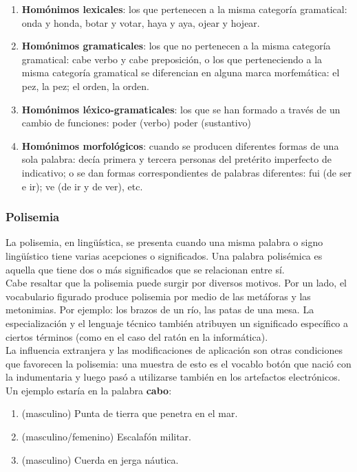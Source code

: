 \documentclass[../all.tex]{subfiles}
\begin{document}
	\begin{enumerate}[resume]
		\setcounter{enumi}{0}
		\item \textbf{Homónimos lexicales}: los que pertenecen a la misma categoría gramatical: onda y honda, botar y votar, haya y aya, ojear y hojear.
		\item \textbf{Homónimos gramaticales}: los que no pertenecen a la misma categoría gramatical: cabe verbo y cabe preposición, o los que perteneciendo a la misma categoría gramatical se diferencian en alguna marca morfemática: el pez, la pez; el orden, la orden.
		\item \textbf{Homónimos léxico-gramaticales}: los que se han formado a través de un cambio de funciones: poder (verbo) poder (sustantivo)
		\item \textbf{Homónimos morfológicos}: cuando se producen diferentes formas de una sola palabra: decía primera y tercera personas del pretérito imperfecto de indicativo; o se dan formas correspondientes de palabras diferentes: fui (de ser e ir); ve (de ir y de ver), etc.
	\end{enumerate}

\subsubsection{Polisemia}
	La polisemia, en lingüística, se presenta cuando una misma palabra o signo lingüístico tiene varias acepciones o significados. Una palabra polisémica es aquella que tiene dos o más significados que se relacionan entre sí.\\
	
	Cabe resaltar que la polisemia puede surgir por diversos motivos. Por un lado, el vocabulario figurado produce polisemia por medio de las metáforas y las metonimias. Por ejemplo: los brazos de un río, las patas de una mesa. La especialización y el lenguaje técnico también atribuyen un significado específico a ciertos términos (como en el caso del ratón en la informática).\\
	La influencia extranjera y las modificaciones de aplicación son otras condiciones que favorecen la polisemia: una muestra de esto es el vocablo botón que nació con la indumentaria y luego pasó a utilizarse también en los artefactos electrónicos.\\
	Un ejemplo estaría en la palabra \textbf{cabo}:
	\begin{enumerate}[resume]
		\setcounter{enumi}{0}
		\item (masculino) Punta de tierra que penetra en el mar.
		\item (masculino/femenino) Escalafón militar.
		\item (masculino) Cuerda en jerga náutica.
	\end{enumerate}
\end{document}

